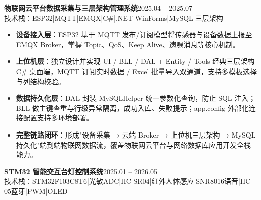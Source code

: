 \documentclass[10pt,a4paper]{article}
\newcommand{\projectblock}[3]{%
    {\bfseries\color{darktext}#1}\hfill{\color{graytext}#2}\\%
    {\small\color{graytext}#3}%
    \vspace{0.2em}%
}
\begin{document}
\vspace{0.15em}

\projectblock{物联网云平台数据采集与三层架构管理系统}{2025.04 -- 2025.07}{技术栈：ESP32\hspace{0.3em}|\hspace{0.3em}MQTT\hspace{0.3em}|\hspace{0.3em}EMQX\hspace{0.3em}|\hspace{0.3em}C\#\hspace{0.3em}|\hspace{0.3em}.NET WinForms\hspace{0.3em}|\hspace{0.3em}MySQL\hspace{0.3em}|\hspace{0.3em}三层架构}

\begin{itemize}[leftmargin=1.5em, itemsep=2pt, parsep=0pt, topsep=2pt]
    \item \textbf{设备接入层}：ESP32 基于 MQTT 发布/订阅模型将传感器与设备数据上报至 EMQX Broker，掌握 Topic、QoS、Keep Alive、遗嘱消息等核心机制。
    \item \textbf{上位机层}：独立设计并实现 UI / BLL / DAL + Entity / Tools 经典三层架构 C\# 桌面端，MQTT 订阅实时数据 / Excel 批量导入双通道，支持多模板选择与列结构校验。
    \item \textbf{数据持久化层}：DAL 封装 MySQLHelper 统一参数化查询，防止 SQL 注入；BLL 做主键查重与行级异常隔离，成功入库、失败提示；app.config 外部化连接配置支持多环境部署。
    \item \textbf{完整链路闭环}：形成"设备采集 → 云端 Broker → 上位机三层架构 → MySQL 持久化"端到端物联网数据流，覆盖物联网云平台与网络数据库应用开发全栈能力。
\end{itemize}

\vspace{0.15em}

\projectblock{STM32 智能交互台灯控制系统}{2025.01 -- 2026.05}{技术栈：STM32F103C8T6\hspace{0.3em}|\hspace{0.3em}光敏ADC\hspace{0.3em}|\hspace{0.3em}HC-SR04\hspace{0.3em}|\hspace{0.3em}红外人体感应\hspace{0.3em}|\hspace{0.3em}SNR8016语音\hspace{0.3em}|\hspace{0.3em}HC-05蓝牙\hspace{0.3em}|\hspace{0.3em}PWM\hspace{0.3em}|\hspace{0.3em}OLED}
\end{document}
